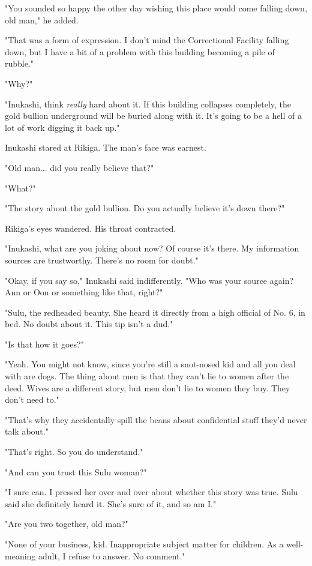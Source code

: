 "You sounded so happy the other day wishing this place would come
falling down, old man," he added.

"That was a form of expression. I don't mind the Correctional Facility
falling down, but I have a bit of a problem with this building becoming
a pile of rubble."~

"Why?"

"Inukashi, think \emph{really} hard about it. If this building collapses
completely, the gold bullion underground will be buried along with it.
It's going to be a hell of a lot of work digging it back up."

Inukashi stared at Rikiga. The man's face was earnest.

"Old man... did you really believe that?"

"What?"

"The story about the gold bullion. Do you actually believe it's down
there?"

Rikiga's eyes wandered. His throat contracted.

"Inukashi, what are you joking about now? Of course it's there. My
information sources are trustworthy. There's no room for doubt."

"Okay, if you say so," Inukashi said indifferently. "Who was your source
again? Ann or Oon or something like that, right?"

"Sulu, the redheaded beauty. She heard it directly from a high official
of No. 6, in bed. No doubt about it. This tip isn't a dud."

"Is that how it goes?"

"Yeah. You might not know, since you're still a snot-nosed kid and all
you deal with are dogs. The thing about men is that they can't lie to
women after the deed. Wives are a different story, but men don't lie to
women they buy. They don't need to."

"That's why they accidentally spill the beans about confidential stuff
they'd never talk about."

"That's right. So you do understand."

"And can you trust this Sulu woman?"

"I sure can. I pressed her over and over about whether this story was
true. Sulu said she definitely heard it. She's sure of it, and so am I."

"Are you two together, old man?"

"None of your business, kid. Inappropriate subject matter for children.
As a well-meaning adult, I refuse to answer. No comment."

